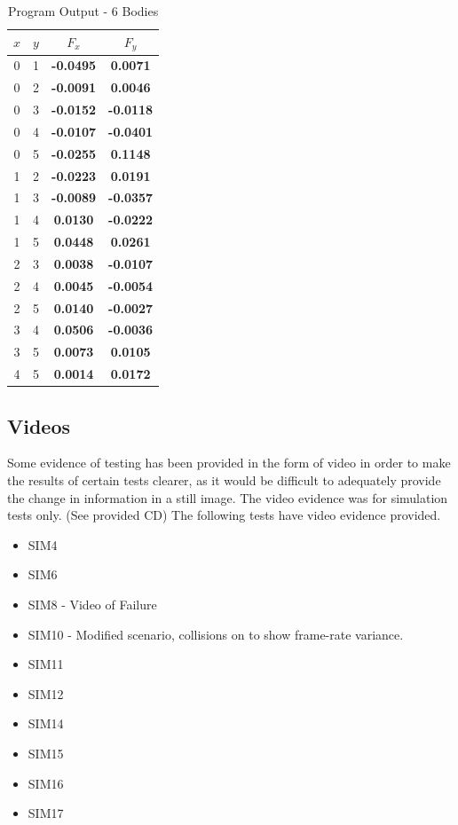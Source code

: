 \pagebreak

\begin{table}[H]
\footnotesize
\centering
\caption{Program Output - 6 Bodies}
\def\arraystretch{1.5}
\begin{tabular}{|c|c|c|c|} \hline
$x$ & $y$ & $F_x$ & $F_y$ \\ \hline
0 & 1	&	\textbf{-0.0495} & \textbf{ 0.0071} \\ \hline
0 & 2	&	\textbf{-0.0091} & \textbf{ 0.0046} \\ \hline
0 & 3	&	\textbf{-0.0152} & \textbf{-0.0118} \\ \hline
0 & 4	&	\textbf{-0.0107} & \textbf{-0.0401} \\ \hline
0 & 5	&	\textbf{-0.0255} & \textbf{ 0.1148} \\ \hline
1 & 2	&	\textbf{-0.0223} & \textbf{ 0.0191} \\ \hline
1 & 3	&	\textbf{-0.0089} & \textbf{-0.0357} \\ \hline
1 & 4	& \textbf{ 0.0130} & \textbf{-0.0222} \\ \hline
1 & 5	&	\textbf{ 0.0448} & \textbf{ 0.0261} \\ \hline
2 & 3	&	\textbf{ 0.0038} & \textbf{-0.0107} \\ \hline
2 & 4	&	\textbf{ 0.0045} & \textbf{-0.0054} \\ \hline
2 & 5	&	\textbf{ 0.0140} & \textbf{-0.0027} \\ \hline
3 & 4	&	\textbf{ 0.0506} & \textbf{-0.0036} \\ \hline
3 & 5	&	\textbf{ 0.0073} & \textbf{ 0.0105} \\ \hline
4 & 5	&	\textbf{ 0.0014} & \textbf{ 0.0172} \\ \hline
\end{tabular}
\end{table}

\subsection{Videos}
Some evidence of testing has been provided in the form of video in order to make the results of certain tests clearer, as it would be difficult to adequately provide the change in information in a still image. The video evidence was for simulation tests only. (See provided CD) The following tests have video evidence provided.

\begin{itemize}
\item SIM4
\item SIM6
\item SIM8 - Video of Failure
\item SIM10 - Modified scenario, collisions on to show frame-rate variance.
\item SIM11
\item SIM12
\item SIM14
\item SIM15
\item SIM16
\item SIM17
\end{itemize}

